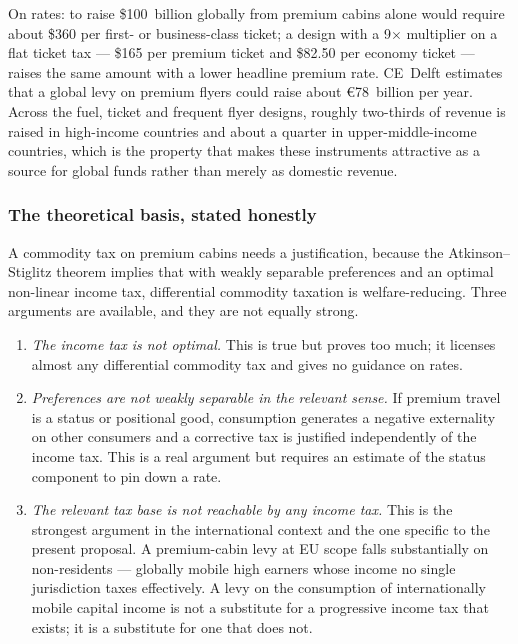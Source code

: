 \documentclass[11pt]{article}
\begin{document}
On rates: to raise \$100~billion globally from premium cabins alone would
require about \$360 per first- or business-class ticket; a design with a
9$\times$ multiplier on a flat ticket tax --- \$165 per premium ticket and
\$82.50 per economy ticket --- raises the same amount with a lower headline
premium rate. CE~Delft estimates that a global levy on premium flyers could
raise about €78~billion per year. Across the fuel, ticket and frequent flyer
designs, roughly two-thirds of revenue is raised in high-income countries and
about a quarter in upper-middle-income countries, which is the property that
makes these instruments attractive as a source for global funds rather than
merely as domestic revenue.

\subsubsection{The theoretical basis, stated honestly}

A commodity tax on premium cabins needs a justification, because the
Atkinson--Stiglitz theorem implies that with weakly separable preferences and an
optimal non-linear income tax, differential commodity taxation is
welfare-reducing. Three arguments are available, and they are not equally
strong.

\begin{enumerate}[label=(\alph*)]
  \item \emph{The income tax is not optimal.} This is true but proves too much;
  it licenses almost any differential commodity tax and gives no guidance on
  rates.
  \item \emph{Preferences are not weakly separable in the relevant sense.} If
  premium travel is a status or positional good, consumption generates a
  negative externality on other consumers and a corrective tax is justified
  independently of the income tax. This is a real argument but requires an
  estimate of the status component to pin down a rate.
  \item \emph{The relevant tax base is not reachable by any income tax.} This is
  the strongest argument in the international context and the one specific to
  the present proposal. A premium-cabin levy at EU scope falls substantially on
  non-residents --- globally mobile high earners whose income no single
  jurisdiction taxes effectively. A levy on the consumption of internationally
  mobile capital income is not a substitute for a progressive income tax that
  exists; it is a substitute for one that does not.
\end{enumerate}
\end{document}
